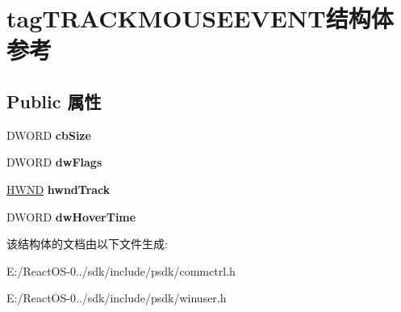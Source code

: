 \hypertarget{structtag_t_r_a_c_k_m_o_u_s_e_e_v_e_n_t}{}\section{tag\+T\+R\+A\+C\+K\+M\+O\+U\+S\+E\+E\+V\+E\+N\+T结构体 参考}
\label{structtag_t_r_a_c_k_m_o_u_s_e_e_v_e_n_t}
\subsection*{Public 属性}
\begin{DoxyCompactItemize}
\item 
\mbox{\label{structtag_t_r_a_c_k_m_o_u_s_e_e_v_e_n_t_a1d143df48b4f5f942c138de9897b7a43}} 
D\+W\+O\+RD {\bfseries cb\+Size}
\item 
\mbox{\label{structtag_t_r_a_c_k_m_o_u_s_e_e_v_e_n_t_ac66b28cc9628553ffce0ead431fb5624}} 
D\+W\+O\+RD {\bfseries dw\+Flags}
\item 
\mbox{\label{structtag_t_r_a_c_k_m_o_u_s_e_e_v_e_n_t_aacf9339bf0af46654ce5215d415f723f}} 
\hyperlink{interfacevoid}{H\+W\+ND} {\bfseries hwnd\+Track}
\item 
\mbox{\label{structtag_t_r_a_c_k_m_o_u_s_e_e_v_e_n_t_aeb0c3721efd7ea1cd0f2695d231fd54b}} 
D\+W\+O\+RD {\bfseries dw\+Hover\+Time}
\end{DoxyCompactItemize}


该结构体的文档由以下文件生成\+:\begin{DoxyCompactItemize}
\item 
E\+:/\+React\+O\+S-\/0../sdk/include/psdk/commctrl.\+h\item 
E\+:/\+React\+O\+S-\/0../sdk/include/psdk/winuser.\+h\end{DoxyCompactItemize}

